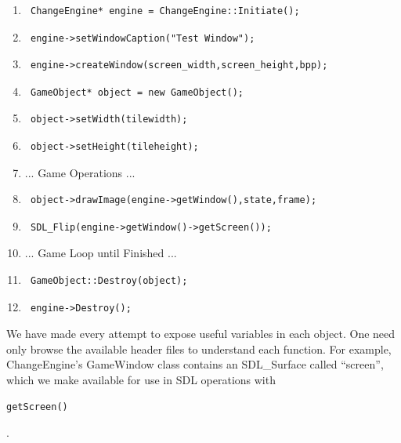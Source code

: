 \documentclass[12pt]{article}
\begin{document}
\begin{enumerate}
 \item \begin{verbatim} ChangeEngine* engine = ChangeEngine::Initiate(); \end{verbatim}
 \item \begin{verbatim} engine->setWindowCaption("Test Window"); \end{verbatim}
 \item \begin{verbatim} engine->createWindow(screen_width,screen_height,bpp); \end{verbatim}
 \item \begin{verbatim} GameObject* object = new GameObject(); \end{verbatim}
 \item \begin{verbatim} object->setWidth(tilewidth); \end{verbatim}
 \item \begin{verbatim} object->setHeight(tileheight); \end{verbatim}
 \item ... Game Operations ...
 \item \begin{verbatim} object->drawImage(engine->getWindow(),state,frame); \end{verbatim}
 \item \begin{verbatim} SDL_Flip(engine->getWindow()->getScreen()); \end{verbatim}
 \item ... Game Loop until Finished ...
 \item \begin{verbatim} GameObject::Destroy(object); \end{verbatim}
 \item \begin{verbatim} engine->Destroy(); \end{verbatim}
\end{enumerate}

We have made every attempt to expose useful variables in each object. One need only browse the available header files to understand each function. For example, ChangeEngine's GameWindow class contains an SDL\_Surface called ``screen'', which we make available for use in SDL operations with \begin{verbatim}getScreen()\end{verbatim}.
\end{document}
